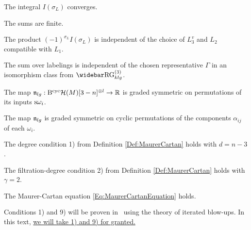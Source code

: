 \documentclass[\MainFolder/Text.tex]{subfiles}
\begin{document}
\begin{PlainList}
 \item The integral $I(\sigma_L)$ converges.
 \item The sums are finite.
 \item The product $(-1)^{\sigma_L} I(\sigma_L)$ is independent of the choice of $L_3^v$ and $L_2$ compatible with $L_1$.
 \item The sum over labelings is independent of the chosen representative $\Gamma$ in an isomorphism class from $\TRRG_{klg}$.
  \item The map $\mathfrak{n}_{lg}: \mathrm{B}^{\mathrm{cyc}}\mathcal{H}(M)[3-n]^{\otimes l} \rightarrow \mathbb{R}$ is graded symmetric on permutations of its inputs $\mathrm{s}\omega_i$.
 \item The map $\mathfrak{n}_{lg}$ is graded symmetric on cyclic permutations of the components $\alpha_{ij}$ of each $\omega_{i}$.
 \item The degree condition 1) from Definition \ref{Def:MaurerCartan} holds with $d = n-3$.
 \item The filtration-degree condition 2) from Definition \ref{Def:MaurerCartan} holds with $\gamma = 2$.
 \item The Maurer-Cartan equation \eqref{Eq:MaurerCartanEquation} holds.
\end{PlainList}

Conditions 1) and 9) will be proven in~\cite{Cieliebak2018} using the theory of iterated blow-ups. In this text, \underline{we will take 1) and 9) for granted.} 
\end{document}
